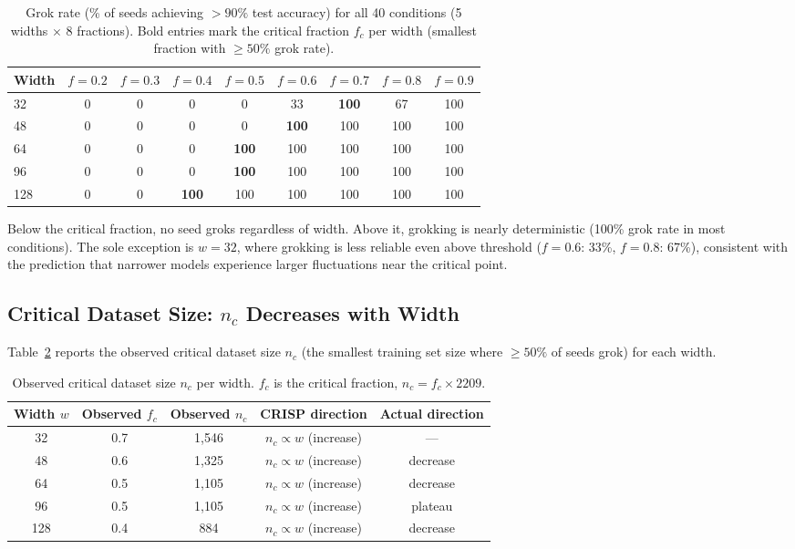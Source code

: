 \documentclass{article}
\newcommand{\nc}{n_c}
\begin{document}
\begin{table}[t]
\centering
\caption{Grok rate (\% of seeds achieving $>90\%$ test accuracy) for all 40 conditions (5 widths $\times$ 8 fractions). Bold entries mark the critical fraction $f_c$ per width (smallest fraction with $\geq 50\%$ grok rate).}
\label{tab:full_results}
\vspace{0.5em}
\begin{tabular}{@{}lcccccccc@{}}
\toprule
\textbf{Width} & $f{=}0.2$ & $f{=}0.3$ & $f{=}0.4$ & $f{=}0.5$ & $f{=}0.6$ & $f{=}0.7$ & $f{=}0.8$ & $f{=}0.9$ \\
\midrule
32  & 0 & 0 & 0 & 0 & 33 & \textbf{100} & 67 & 100 \\
48  & 0 & 0 & 0 & 0 & \textbf{100} & 100 & 100 & 100 \\
64  & 0 & 0 & 0 & \textbf{100} & 100 & 100 & 100 & 100 \\
96  & 0 & 0 & 0 & \textbf{100} & 100 & 100 & 100 & 100 \\
128 & 0 & 0 & \textbf{100} & 100 & 100 & 100 & 100 & 100 \\
\bottomrule
\end{tabular}
\end{table}

Below the critical fraction, no seed groks regardless of width.
Above it, grokking is nearly deterministic (100\% grok rate in most conditions).
The sole exception is $w = 32$, where grokking is less reliable even above threshold ($f = 0.6$: 33\%, $f = 0.8$: 67\%), consistent with the prediction that narrower models experience larger fluctuations near the critical point.

\subsection{Critical Dataset Size: \texorpdfstring{$\nc$}{nc} Decreases with Width}

Table~\ref{tab:nc_observed} reports the observed critical dataset size $\nc$ (the smallest training set size where $\geq 50\%$ of seeds grok) for each width.

\begin{table}[t]
\centering
\caption{Observed critical dataset size $\nc$ per width. $f_c$ is the critical fraction, $\nc = f_c \times 2209$.}
\label{tab:nc_observed}
\vspace{0.5em}
\begin{tabular}{@{}ccccc@{}}
\toprule
\textbf{Width $w$} & \textbf{Observed $f_c$} & \textbf{Observed $\nc$} & \textbf{CRISP direction} & \textbf{Actual direction} \\
\midrule
32  & 0.7 & 1{,}546 & $\nc \propto w$ (increase) & --- \\
48  & 0.6 & 1{,}325 & $\nc \propto w$ (increase) & decrease \\
64  & 0.5 & 1{,}105 & $\nc \propto w$ (increase) & decrease \\
96  & 0.5 & 1{,}105 & $\nc \propto w$ (increase) & plateau \\
128 & 0.4 & 884    & $\nc \propto w$ (increase) & decrease \\
\bottomrule
\end{tabular}
\end{table}
\end{document}

